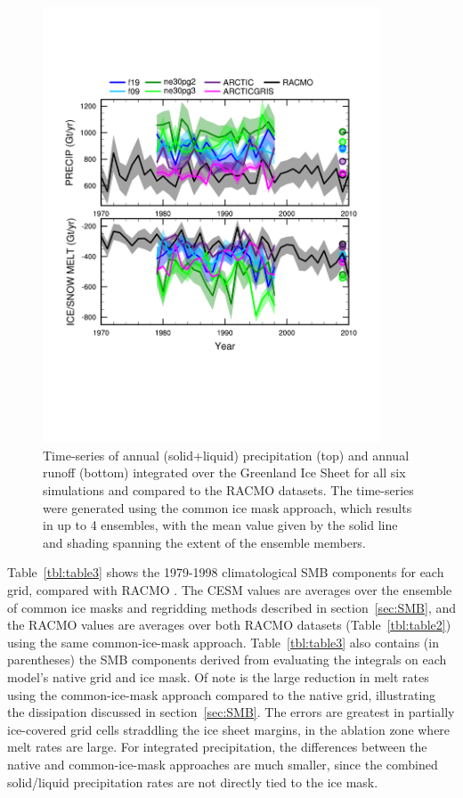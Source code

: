 \documentclass[draft]{agujournal2019}
\begin{document}
\begin{figure}[t]
\begin{center}
         \includegraphics[width=100mm]{figs/temp_tseries_GRIS.pdf}
\end{center}
\caption{Time-series of annual (solid+liquid) precipitation (top) and annual runoff (bottom) integrated over the Greenland Ice Sheet for all six simulations and compared to the RACMO datasets. The time-series were generated using the common ice mask approach, which results in up to 4 ensembles, with the mean value given by the solid line and shading spanning the extent of the ensemble members.}
\label{fig:tseries}
\end{figure}

Table~\ref{tbl:table3} shows the 1979-1998 climatological SMB components for each grid, compared with RACMO {\color{purple}{Andrew - do you want to talk about the values at all?}}.
The CESM values are averages over the ensemble of common ice masks and regridding methods described in section~\ref{sec:SMB}, and the RACMO values are averages over both RACMO datasets (Table~\ref{tbl:table2}) using the same common-ice-mask approach. Table~\ref{tbl:table3} also contains (in parentheses) the SMB components derived from evaluating the integrals on each model's native grid and ice mask. Of note is the large reduction in melt rates using the common-ice-mask approach compared to the native grid, illustrating the dissipation discussed in section~\ref{sec:SMB}. The errors are greatest in partially ice-covered grid cells straddling the ice sheet margins, in the ablation zone where melt rates are large. For integrated precipitation, the differences between the native and common-ice-mask approaches are much smaller, since the combined solid/liquid precipitation rates are not directly tied to the ice mask.
\end{document}
